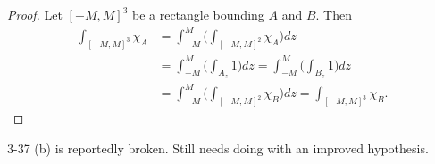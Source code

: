 \documentclass[20pt]{article}
\theoremstyle{plain}
\theoremstyle{definition}
\begin{document}
\begin{proof}
  Let $[-M, M]^3$ be a rectangle bounding $A$ and $B$. Then 
  \begin{align*}
    \int_{[-M, M]^3}\chi_A 
    &= \int_{-M}^M \bigg( \int_{[-M, M]^2} \chi_A \bigg)dz \\
    &= \int_{-M}^M \bigg( \int_{A_z} 1 \bigg) dz
    = \int_{-M}^M \bigg( \int_{B_z} 1 \bigg) dz \\
    &= \int_{-M}^M \bigg( \int_{[-M, M]^2} \chi_B \bigg)dz 
    = \int_{[-M, M]^3}\chi_B.
  \end{align*}
\end{proof}


\color{Blue}
3-37 (b) is reportedly broken. Still needs doing with an improved hypothesis.
\color{Black}
\end{document}
